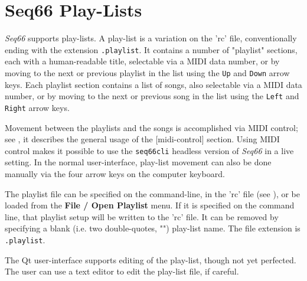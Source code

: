 %
%
%

\section{Seq66 Play-Lists}
\label{sec:playlist}

   \textsl{Seq66} supports play-lists.
   A play-list is a variation on the 'rc' file, conventionally ending with the
   extension \texttt{.playlist}.  It contains a number of "playlist" sections,
   each with a human-readable title, selectable via a MIDI data number,
   or by moving to the next or previous playlist in the list using the
   \texttt{Up} and \texttt{Down} arrow keys.
   Each playlist section contains a list of songs, also selectable via a MIDI
   data number, or by moving to the next or previous song in the list using the
   \texttt{Left} and \texttt{Right} arrow keys.

   Movement between the playlists and the songs is accomplished via 
   MIDI control; see
   ,
   it describes the general usage of the [midi-control] section.
   Using MIDI control makes it possible to use the \texttt{seq66cli}
   headless version of \textsl{Seq66} in a live setting.
   In the normal user-interface, play-list movement
   can also be done manually via the four arrow keys on the computer
   keyboard.

   The playlist file can be specified on the command-line, in
   the 'rc' file (see ), or be loaded
   from the \textbf{File / Open Playlist} menu.
   If it is specified on the command line, that playlist setup will
   be written to the 'rc' file.  It can be removed by specifying a blank (i.e.
   two double-quotes, "") play-list name.
   The file extension is \texttt{.playlist}.

   The Qt user-interface supports editing of the play-list, though not yet
   perfected.
   The user can use a text editor to edit the play-list file, if careful.

